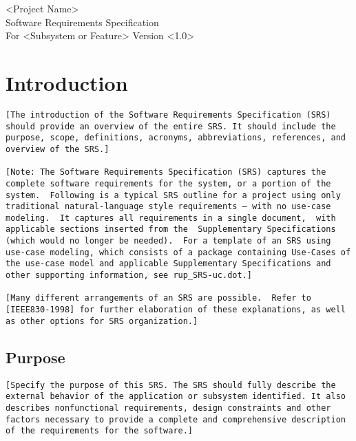 \documentclass[a4paper,12pt,chapterprefix=false,bibliography=totoc,listof=totoc]{scrreprt}
\begin{document}
\begin{flushright}
<Project Name>
\\
Software Requirements Specification
\\
For <Subsystem or Feature>
\bigbreak
Version <1.0>
\end{flushright}
\begin{versionhistory}
\end{versionhistory}

\chapter{Introduction}
\begin{verbatim}
[The introduction of the Software Requirements Specification (SRS) should provide an overview of the entire SRS. It should include the purpose, scope, definitions, acronyms, abbreviations, references, and overview of the SRS.]

[Note: The Software Requirements Specification (SRS) captures the complete software requirements for the system, or a portion of the system.  Following is a typical SRS outline for a project using only traditional natural-language style requirements – with no use-case modeling.  It captures all requirements in a single document,  with  applicable sections inserted from the  Supplementary Specifications (which would no longer be needed).  For a template of an SRS using use-case modeling, which consists of a package containing Use-Cases of the use-case model and applicable Supplementary Specifications and other supporting information, see rup_SRS-uc.dot.]

[Many different arrangements of an SRS are possible.  Refer to [IEEE830-1998] for further elaboration of these explanations, as well as other options for SRS organization.]
\end{verbatim}

\section{Purpose}
\begin{verbatim}
[Specify the purpose of this SRS. The SRS should fully describe the external behavior of the application or subsystem identified. It also describes nonfunctional requirements, design constraints and other factors necessary to provide a complete and comprehensive description of the requirements for the software.]
\end{verbatim}
\end{document}
